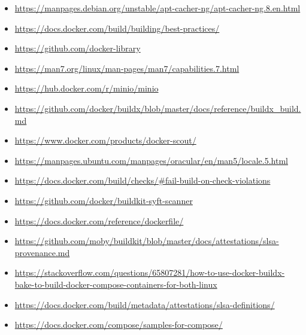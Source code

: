 \documentclass{article}
\begin{document}
\begin{itemize}
  \item \href{https://manpages.debian.org/unstable/apt-cacher-ng/apt-cacher-ng.8.en.html}{https://manpages.debian.org/unstable/apt-cacher-ng/apt-cacher-ng.8.en.html}
  \item \href{https://docs.docker.com/build/building/best-practices/}{https://docs.docker.com/build/building/best-practices/}
  \item \href{https://github.com/docker-library}{https://github.com/docker-library}
  \item \href{https://man7.org/linux/man-pages/man7/capabilities.7.html}{https://man7.org/linux/man-pages/man7/capabilities.7.html}
  \item \href{https://hub.docker.com/r/minio/minio}{https://hub.docker.com/r/minio/minio}
  \item \href{https://github.com/docker/buildx/blob/master/docs/reference/buildx\_build.md}{https://github.com/docker/buildx/blob/master/docs/reference/buildx\_build.md}
  \item \href{https://www.docker.com/products/docker-scout/}{https://www.docker.com/products/docker-scout/}
  \item \href{https://manpages.ubuntu.com/manpages/oracular/en/man5/locale.5.html}{https://manpages.ubuntu.com/manpages/oracular/en/man5/locale.5.html}
  \item \href{https://docs.docker.com/build/checks/\#fail-build-on-check-violations}{https://docs.docker.com/build/checks/\#fail-build-on-check-violations}
  \item \href{https://github.com/docker/buildkit-syft-scanner}{https://github.com/docker/buildkit-syft-scanner}
  \item \href{https://docs.docker.com/reference/dockerfile/}{https://docs.docker.com/reference/dockerfile/}
  \item \href{https://github.com/moby/buildkit/blob/master/docs/attestations/slsa-provenance.md}{https://github.com/moby/buildkit/blob/master/docs/attestations/slsa-provenance.md}
  \item \href{https://stackoverflow.com/questions/65807281/how-to-use-docker-buildx-bake-to-build-docker-compose-containers-for-both-linux}{https://stackoverflow.com/questions/65807281/how-to-use-docker-buildx-bake-to-build-docker-compose-containers-for-both-linux}
  \item \href{https://docs.docker.com/build/metadata/attestations/slsa-definitions/}{https://docs.docker.com/build/metadata/attestations/slsa-definitions/}
  \item \href{https://docs.docker.com/compose/samples-for-compose/}{https://docs.docker.com/compose/samples-for-compose/}

\end{itemize}
\end{document}

